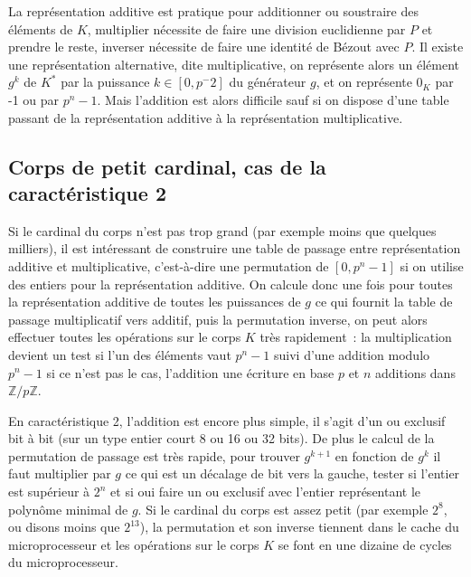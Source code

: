 \documentclass[a4paper,11pt]{book}
\begin{document}
\begin{giacjshere}
La repr\'esentation additive est pratique pour additionner
ou soustraire des \'el\'ements de $K$, multiplier
n\'ecessite de faire une division euclidienne par $P$ et prendre
le reste, inverser n\'ecessite de faire une identit\'e de B\'ezout
avec $P$. Il existe une repr\'esentation alternative, dite
multiplicative, on repr\'esente alors un \'el\'ement $g^k$ de $K^*$
par la puissance $k \in [0,p^-2]$ du g\'en\'erateur $g$, et on
repr\'esente $0_K$ par -1 ou par $p^n-1$. Mais l'addition
est alors difficile sauf si on dispose d'une table passant
de la repr\'esentation additive \`a la repr\'esentation
multiplicative.

\subsection{Corps de petit cardinal, cas de la caract\'eristique 2}
Si le cardinal du corps n'est pas trop grand (par exemple
moins que quelques milliers), il est int\'eressant de construire
une table de passage entre repr\'esentation additive et
multiplicative, c'est-\`a-dire une permutation de $[0,p^n-1]$
si on utilise des entiers pour la repr\'esentation additive.
On calcule donc une fois pour toutes la repr\'esentation additive
de toutes les puissances de $g$ ce qui fournit la table de passage
multiplicatif vers additif, puis la permutation inverse, on peut alors
effectuer toutes les op\'erations sur le corps $K$ tr\`es
rapidement~: la multiplication devient un test si l'un
des \'el\'ements vaut $p^n-1$ suivi d'une addition modulo $p^n-1$ si
ce n'est pas le cas, l'addition une \'ecriture en base $p$ et $n$
additions dans $\mathbb{Z}/p\mathbb{Z}$.

En caract\'eristique 2, l'addition est encore plus simple, il s'agit
d'un ou exclusif bit \`a bit (sur un type entier court 8 ou 16 ou 32 bits). 
De plus le calcul de la permutation
de passage est tr\`es rapide, pour trouver $g^{k+1}$ en fonction
de $g^k$ il faut multiplier par $g$ ce qui est un d\'ecalage
de bit vers la gauche, tester si l'entier est sup\'erieur \`a $2^n$
et si oui faire un ou exclusif avec l'entier repr\'esentant le
polyn\^ome minimal de $g$. Si le cardinal du corps est assez petit
(par exemple $2^8$, ou disons moins que $2^{13}$),
la permutation et son inverse tiennent dans le cache du
microprocesseur et les op\'erations sur le corps $K$ se font
en une dizaine de cycles du microprocesseur.

\pagebreak


\end{giacjshere}
\end{document}

